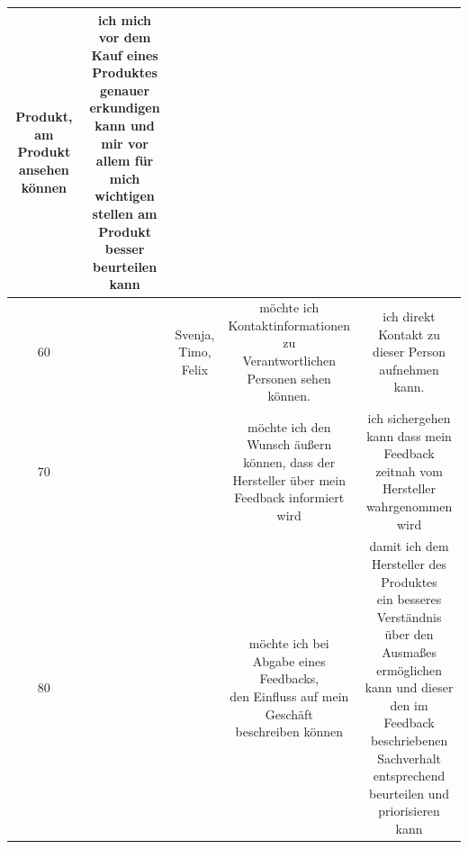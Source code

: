 \begin{table}[H]
{\begin{tabular}{ | c | c | c |c |c |}
{			Produkt, am Produkt ansehen können} &  \makecell{ich mich vor dem Kauf eines Produktes genauer\\
			erkundigen kann und mir vor allem für mich\\
			wichtigen stellen am Produkt besser beurteilen\\
			kann
}\\
		\hline	
		60 &  \makecell{Endkunde}  & \makecell{Svenja, \\ Timo, \\ Felix} & \makecell{möchte ich Kontaktinformationen zu\\
			Verantwortlichen Personen sehen\\
			können.} &  \makecell{ich direkt Kontakt zu dieser Person aufnehmen\\
			kann.}\\
		\hline	
		70 &  \makecell{Endkunde}  & \makecell{Timo} & \makecell{möchte ich den Wunsch äußern\\
			können, dass der Hersteller über mein\\
			Feedback informiert wird} &  \makecell{ich sichergehen kann dass mein Feedback\\
			zeitnah vom Hersteller wahrgenommen wird}\\
		\hline	
		80 &  \makecell{Endkunde}  & \makecell{Timo} & \makecell{möchte ich bei Abgabe eines Feedbacks,\\ den
			Einfluss auf mein Geschäft\\
			beschreiben können} &  \makecell{damit ich dem Hersteller des Produktes\\ ein besseres Verständnis über den Ausmaßes ermöglichen\\ kann und dieser den im Feedback beschriebenen\\ Sachverhalt entsprechend beurteilen und priorisieren kann }\\
		\hline	
\end{tabular}}
\end{table}



